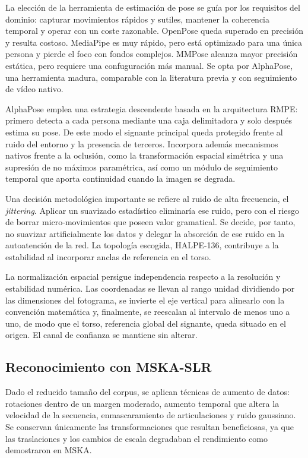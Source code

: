\documentclass[11pt]{article}
\begin{document}
La elección de la herramienta de estimación de pose se guía por los requisitos del dominio: capturar movimientos rápidos y sutiles, mantener la coherencia temporal y operar con un coste razonable. OpenPose queda superado en precisión y resulta costoso. MediaPipe es muy rápido, pero está optimizado para una única persona y pierde el foco con fondos complejos. MMPose alcanza mayor precisión estática, pero requiere una confuguración más manual. Se opta por AlphaPose, una herramienta madura, comparable con la literatura previa y con seguimiento de vídeo nativo.

AlphaPose emplea una estrategia descendente basada en la arquitectura RMPE: primero detecta a cada persona mediante una caja delimitadora y solo después estima su pose. De este modo el signante principal queda protegido frente al ruido del entorno y la presencia de terceros. Incorpora además mecanismos nativos frente a la oclusión, como la transformación espacial simétrica y una supresión de no máximos paramétrica, así como un módulo de seguimiento temporal que aporta continuidad cuando la imagen se degrada.

Una decisión metodológica importante se refiere al ruido de alta frecuencia, el \textit{jittering}. Aplicar un suavizado estadístico eliminaría ese ruido, pero con el riesgo de borrar micro-movimientos que poseen valor gramatical. Se decide, por tanto, no suavizar artificialmente los datos y delegar la absorción de ese ruido en la autoatención de la red. La topología escogida, HALPE-136, contribuye a la estabilidad al incorporar anclas de referencia en el torso.

La normalización espacial persigue independencia respecto a la resolución y estabilidad numérica. Las coordenadas se llevan al rango unidad dividiendo por las dimensiones del fotograma, se invierte el eje vertical para alinearlo con la convención matemática y, finalmente, se reescalan al intervalo de menos uno a uno, de modo que el torso, referencia global del signante, queda situado en el origen. El canal de confianza se mantiene sin alterar.

\subsection{Reconocimiento con MSKA-SLR}

Dado el reducido tamaño del corpus, se aplican técnicas de aumento de datos: rotaciones dentro de un margen moderado, aumento temporal que altera la velocidad de la secuencia, enmascaramiento de articulaciones y ruido gaussiano. Se conservan únicamente las transformaciones que resultan beneficiosas, ya que las traslaciones y los cambios de escala degradaban el rendimiento como demostraron en MSKA.
\end{document}

